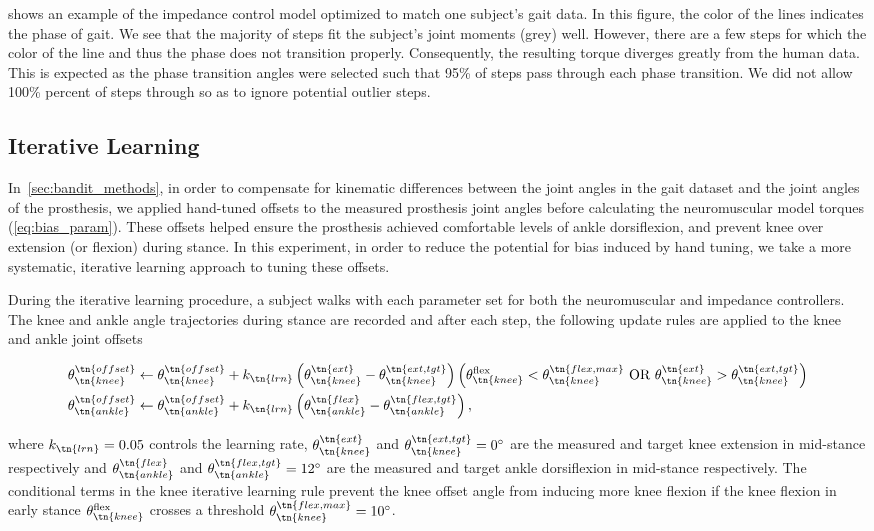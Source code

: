  shows an example of the impedance control model
optimized to match one subject's gait data. In this figure, the color of the
lines indicates the phase of gait. We see that the majority of steps fit the
subject's joint moments (grey) well. However, there are a few steps for which
the color of the line and thus the phase does not transition properly.
Consequently, the resulting torque diverges greatly from the human data. This is
expected as the phase transition angles were selected such that 95\% of steps
pass through each phase transition. We did not allow 100\% percent of steps
through so as to ignore potential outlier steps.

\subsection{Iterative Learning}\label{sec:treadmill_exp_iterative_learning}
In~\cref{sec:bandit_methods}, in order to compensate for kinematic differences
between the joint angles in the gait dataset and the joint angles of the
prosthesis, we applied hand-tuned offsets to the measured prosthesis joint
angles before calculating the neuromuscular model torques
(\cref{eq:bias_param}). These offsets helped ensure the prosthesis achieved
comfortable levels of ankle dorsiflexion, and prevent knee over extension (or
flexion) during stance. In this experiment, in order to reduce the potential for
bias induced by hand tuning, we take a more systematic, iterative learning
approach to tuning these offsets.

During the iterative learning procedure, a subject walks with each parameter set
for both the neuromuscular and impedance controllers. The knee and ankle angle
trajectories during stance are recorded and after each step, the following
update rules are applied to the knee and ankle joint offsets
\begin{fullwidth}
\begin{align}
    \theta_\tn{knee}^\tn{offset} &\leftarrow \theta_\tn{knee}^\tn{offset} +
    k_\tn{lrn} \left(\theta_\tn{knee}^\tn{ext} - \theta_\tn{knee}^\tn{ext,tgt} \right)
    \left(\theta_\tn{knee}^\textrm{flex} < \theta_\tn{knee}^\tn{flex,max}
    \textrm{~OR~} \theta_\tn{knee}^\tn{ext} > \theta_\tn{knee}^\tn{ext,tgt}\right)\\
    \theta_\tn{ankle}^\tn{offset} &\leftarrow \theta_\tn{ankle}^\tn{offset} +
    k_\tn{lrn} \left(\theta_\tn{ankle}^\tn{flex} - \theta_\tn{ankle}^\tn{flex,tgt} \right),
\end{align}
\end{fullwidth}
where $k_\tn{lrn} = 0.05$ controls the learning rate,
$\theta_\tn{knee}^\tn{ext}$ and $\theta_\tn{knee}^\tn{ext,tgt} = 0^\circ$ are
the measured and target knee extension in mid-stance respectively and
$\theta_\tn{ankle}^\tn{flex}$ and $\theta_\tn{ankle}^\tn{flex,tgt} = 12^\circ$
are the measured and target ankle dorsiflexion in mid-stance respectively. The
conditional terms in the knee iterative learning rule prevent the knee offset
angle from inducing more knee flexion if the knee flexion in early stance
$\theta_\tn{knee}^\textrm{flex}$ crosses a threshold
$\theta_\tn{knee}^\tn{flex,max} = 10^\circ$.

